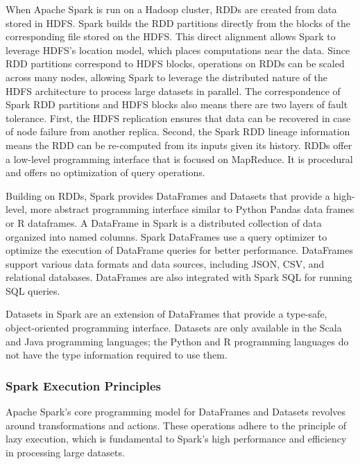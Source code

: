 \begin{advanced}
When Apache Spark is run on a Hadoop cluster, RDDs are created from data stored in HDFS. Spark builds the RDD partitions directly from the blocks of the corresponding file stored on the HDFS. This direct alignment allows Spark to leverage HDFS's location model, which places computations near the data. Since RDD partitions correspond to HDFS blocks, operations on RDDs can be scaled across many nodes, allowing Spark to leverage the distributed nature of the HDFS architecture to process large datasets in parallel. The correspondence of Spark RDD partitions and HDFS blocks also means there are two layers of fault tolerance. First, the HDFS replication ensures that data can be recovered in case of node failure from another replica. Second, the Spark RDD lineage information means the RDD can be re-computed from its inputs given its history. RDDs offer a low-level programming interface that is focused on MapReduce. It is procedural and offers no optimization of query operations. 

Building on RDDs, Spark provides DataFrames and Datasets  that provide a high-level, more abstract programming interface similar to Python Pandas data frames or R dataframes. A DataFrame in Spark is a distributed collection of data organized into named columns. Spark DataFrames use a query optimizer to optimize the execution of DataFrame queries for better performance. DataFrames support various data formats and data sources, including JSON, CSV, and relational databases. DataFrames are also integrated with Spark SQL for running SQL queries.

Datasets in Spark are an extension of DataFrames that provide a type-safe, object-oriented programming interface. Datasets are only available in the Scala and Java programming languages; the Python and R programming languages do not have the type information required to use them.

\subsubsection*{Spark Execution Principles}

Apache Spark's core programming model for DataFrames and Datasets revolves around transformations and actions. These operations adhere to the principle of lazy execution, which is fundamental to Spark's high performance and efficiency in processing large datasets.

\begin{table}
\renewcommand{\arraystretch}{1.25}


\end{table}
\end{advanced}
